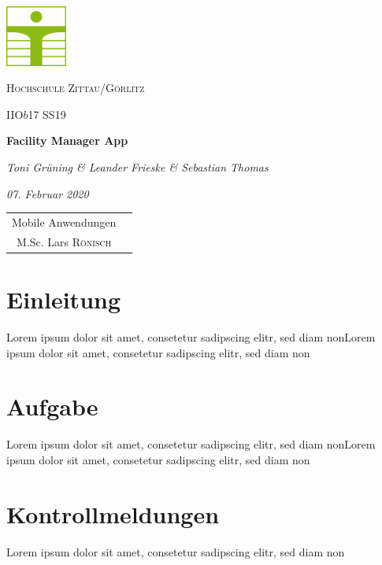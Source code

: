 \documentclass[12pt]{article}
\begin{document}
\begin{titlepage}
	\centering
	\includegraphics[width=0.15\textwidth]{images/hszg_logo.png}\par\vspace{1cm}
	{\scshape\LARGE Hochschule Zittau/Görlitz \par}
	\vspace{1cm}
	{\scshape\Large IIO$b$17 SS19 \par}
	\vspace{1.5cm}
	{\huge\bfseries Facility Manager App \par}
	\vspace{2cm}
	{\large\itshape Toni Grüning \& Leander Frieske \& Sebastian Thomas\par}
	\vspace{2cm}
	{\small\itshape 07. Februar 2020\par}
	\vfill

	\begin{tabular}{cc}
		Mobile Anwendungen  \\
			M.Sc. Lars \textsc{Rönisch}
	\end{tabular}

\end{titlepage}

\clearpage

\tableofcontents

\clearpage

\section{Einleitung}
Lorem ipsum dolor sit amet, consetetur sadipscing elitr, sed diam nonLorem ipsum dolor sit amet, consetetur sadipscing elitr, sed diam non

\section{Aufgabe}
Lorem ipsum dolor sit amet, consetetur sadipscing elitr, sed diam nonLorem ipsum dolor sit amet, consetetur sadipscing elitr, sed diam non

\section{Kontrollmeldungen}
Lorem ipsum dolor sit amet, consetetur sadipscing elitr, sed diam non
\end{document}
